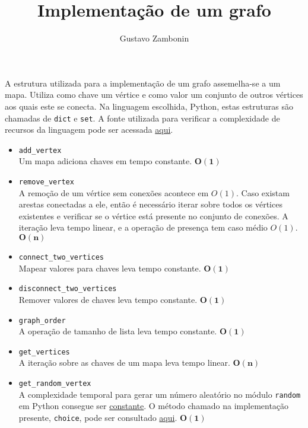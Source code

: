 \documentclass{../sftex/sftex}
\title{Implementação de um grafo}
\author{Gustavo Zambonin}
\begin{document}
\maketitle

A estrutura utilizada para a implementação de um grafo assemelha-se a um mapa.
Utiliza como chave um vértice e como valor um conjunto de outros vértices aos
quais este se conecta. Na linguagem escolhida, Python, estas estruturas são
chamadas de \texttt{dict} e \texttt{set}. A fonte utilizada para verificar a
complexidade de recursos da linguagem pode ser acessada
\href{https://wiki.python.org/moin/TimeComplexity}{aqui}.

\begin{itemize}
    \item \texttt{add\_vertex} \\
    Um mapa adiciona chaves em tempo constante. $\mathbf{O(1)}$

    \item \texttt{remove\_vertex} \\
    A remoção de um vértice sem conexões acontece em $O(1)$. Caso existam arestas
    conectadas a ele, então é necessário iterar sobre todos os vértices
    existentes e verificar se o vértice está presente no conjunto de conexões.
    A iteração leva tempo linear, e a operação de presença tem caso médio $O(1)$.
    $\mathbf{O(n)}$

    \item \texttt{connect\_two\_vertices} \\
    Mapear valores para chaves leva tempo constante. $\mathbf{O(1)}$

    \item \texttt{disconnect\_two\_vertices} \\
    Remover valores de chaves leva tempo constante. $\mathbf{O(1)}$

    \item \texttt{graph\_order} \\
    A operação de tamanho de lista leva tempo constante. $\mathbf{O(1)}$

    \item \texttt{get\_vertices} \\
    A iteração sobre as chaves de um mapa leva tempo linear. $\mathbf{O(n)}$

    \item \texttt{get\_random\_vertex} \\
    A complexidade temporal para gerar um número aleatório no módulo
    \texttt{random} em Python consegue ser
    \href{https://docs.python.org/2/library/random.html}{constante}. O método
    chamado na implementação presente, \texttt{choice}, pode ser consultado
    \href{https://hg.python.org/cpython/file/2.7/Lib/random.py#l273}{aqui}.
    $\mathbf{O(1)}$


\end{itemize}
\end{document}
